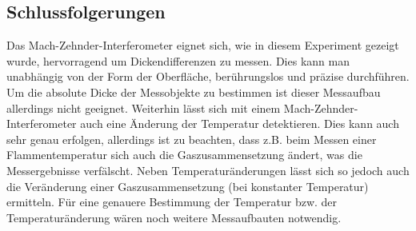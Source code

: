 \subsection{Schlussfolgerungen}
Das Mach-Zehnder-Interferometer eignet sich, wie in diesem Experiment gezeigt wurde, hervorragend um Dickendifferenzen zu messen. Dies kann man unabhängig von der Form der Oberfläche, berührungslos und präzise durchführen. Um die absolute Dicke der Messobjekte zu bestimmen ist dieser Messaufbau allerdings nicht geeignet.
Weiterhin lässt sich mit einem Mach-Zehnder-Interferometer auch eine Änderung der Temperatur detektieren. Dies kann auch sehr genau erfolgen, allerdings ist zu beachten, dass z.B. beim Messen einer Flammentemperatur sich auch die Gaszusammensetzung ändert, was die Messergebnisse verfälscht. 
Neben Temperaturänderungen lässt sich so jedoch auch die Veränderung einer Gaszusammensetzung (bei konstanter Temperatur) ermitteln. Für eine genauere Bestimmung der Temperatur bzw. der Temperaturänderung wären noch weitere Messaufbauten notwendig.  


